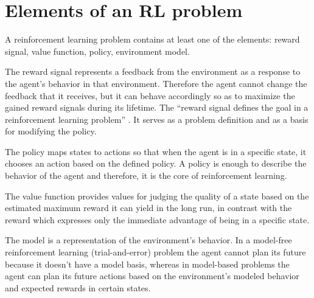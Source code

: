 \section{Elements of an RL problem}\label{ElementsRLproblem}
A reinforcement learning problem contains at least one of the elements: reward signal, value function, policy, environment model.

The reward signal represents a feedback from the environment as a response to the agent’s behavior in that environment. Therefore the agent cannot change the feedback that it receives, but it can behave accordingly so as to maximize the gained reward signals during its lifetime. The “reward signal defines the goal in a reinforcement learning problem” \cite{Sutton}. It serves as a problem definition and as a basis for modifying the policy.

The policy maps states to actions so that when the agent is in a specific state, it chooses an action based on the defined policy. A policy is enough to describe the behavior of the agent and therefore, it is the core of reinforcement learning.

The value function provides values for judging the quality of a state based on the estimated maximum reward it can yield in the long run, in contrast with the reward which expresses only the immediate advantage of being in a specific state.

The model is a representation of the environment’s behavior. In a model-free reinforcement learning (trial-and-error) problem the agent cannot plan its future because it doesn’t have a model basis, whereas in model-based problems the agent can plan its future actions based on the environment’s modeled behavior and expected rewards in certain states.

